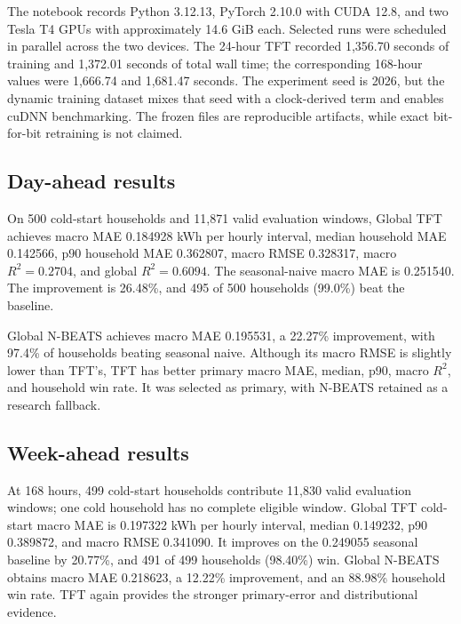 The notebook records Python 3.12.13, PyTorch 2.10.0 with CUDA 12.8, and two Tesla T4 GPUs with approximately 14.6 GiB each. Selected runs were scheduled in parallel across the two devices. The 24-hour TFT recorded 1,356.70 seconds of training and 1,372.01 seconds of total wall time; the corresponding 168-hour values were 1,666.74 and 1,681.47 seconds. The experiment seed is 2026, but the dynamic training dataset mixes that seed with a clock-derived term and enables cuDNN benchmarking. The frozen files are reproducible artifacts, while exact bit-for-bit retraining is not claimed.

\subsection{Day-ahead results}

On 500 cold-start households and 11,871 valid evaluation windows, Global TFT achieves macro MAE 0.184928 kWh per hourly interval, median household MAE 0.142566, p90 household MAE 0.362807, macro RMSE 0.328317, macro $R^2=0.2704$, and global $R^2=0.6094$. The seasonal-naive macro MAE is 0.251540. The improvement is 26.48\%, and 495 of 500 households (99.0\%) beat the baseline.

Global N-BEATS achieves macro MAE 0.195531, a 22.27\% improvement, with 97.4\% of households beating seasonal naive. Although its macro RMSE is slightly lower than TFT's, TFT has better primary macro MAE, median, p90, macro $R^2$, and household win rate. It was selected as primary, with N-BEATS retained as a research fallback.

\subsection{Week-ahead results}

At 168 hours, 499 cold-start households contribute 11,830 valid evaluation windows; one cold household has no complete eligible window. Global TFT cold-start macro MAE is 0.197322 kWh per hourly interval, median 0.149232, p90 0.389872, and macro RMSE 0.341090. It improves on the 0.249055 seasonal baseline by 20.77\%, and 491 of 499 households (98.40\%) win. Global N-BEATS obtains macro MAE 0.218623, a 12.22\% improvement, and an 88.98\% household win rate. TFT again provides the stronger primary-error and distributional evidence.

